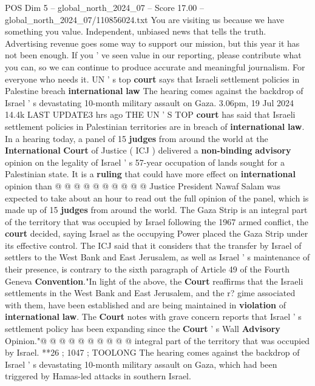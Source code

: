 \begin{textsample}{POS Dim 5 – global\_north\_2024\_07 – Score 17.00 – global\_north\_2024\_07/110856024.txt}  \label{ex:f5_pos_303}
You are visiting us because we have something you value.
Independent, unbiased news that tells the truth.
Advertising revenue goes some way to support our mission, but this year it has not been enough.
If you ' ve seen value in our reporting, please contribute what you can, so we can continue to produce accurate and meaningful journalism.
For everyone who needs it.
UN ' s top \textbf{court} says that Israeli settlement policies in Palestine breach \textbf{international} \textbf{law} The hearing comes against the backdrop of Israel ' s devastating 10-month military assault on Gaza. 3.06pm, 19 Jul 2024 14.4k LAST UPDATE3 hrs ago THE UN ' S TOP \textbf{court} has said that Israeli settlement policies in Palestinian territories are in breach of \textbf{international} \textbf{law}.
In a hearing today, a panel of 15 \textbf{judges} from around the world at the \textbf{International} \textbf{Court} of Justice ( ICJ ) delivered a \textbf{non-binding} \textbf{advisory} opinion on the legality of Israel ' s 57-year occupation of lands sought for a Palestinian state.
It is a \textbf{ruling} that could have more effect on \textbf{international} opinion than @ @ @ @ @ @ @ @ @ @ Justice President Nawaf Salam was expected to take about an hour to read out the full opinion of the panel, which is made up of 15 \textbf{judges} from around the world.
The Gaza Strip is an integral part of the territory that was occupied by Israel following the 1967 armed conflict, the \textbf{court} decided, saying Israel as the occupying Power placed the Gaza Strip under its effective control.
The ICJ said that it considers that the transfer by Israel of settlers to the West Bank and East Jerusalem, as well as Israel ' s maintenance of their presence, is contrary to the sixth paragraph of Article 49 of the Fourth Geneva \textbf{Convention}."In light of the above, the \textbf{Court} reaffirms that the Israeli settlements in the West Bank and East Jerusalem, and the r? gime associated with them, have been established and are being maintained in \textbf{violation} of \textbf{international} \textbf{law}.
The \textbf{Court} notes with grave concern reports that Israel ' s settlement policy has been expanding since the \textbf{Court} ' s Wall \textbf{Advisory} Opinion."@ @ @ @ @ @ @ @ @ @ integral part of the territory that was occupied by Israel. **26 ; 1047 ; TOOLONG The hearing comes against the backdrop of Israel ' s devastating 10-month military assault on Gaza, which had been triggered by Hamas-led attacks in southern Israel.

\end{textsample}
